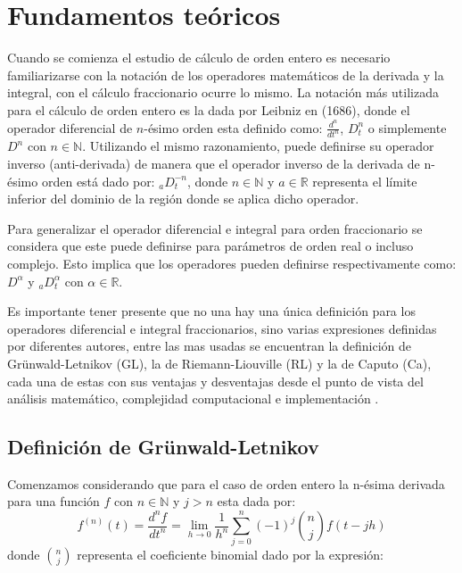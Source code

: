 \chapter{Fundamentos teóricos}		

	Cuando se comienza el estudio de cálculo de orden entero es necesario familiarizarse con la notación de los operadores matemáticos de la derivada y la integral, con el cálculo fraccionario ocurre lo mismo. La notación más utilizada para el cálculo de orden entero es la dada por Leibniz en (1686), donde el operador diferencial de $n$-ésimo orden esta definido como: $\frac{d^{n}}{dt^{n}}$, $D_{t}^{n}$ o simplemente $D^{n}$ con $n \in \mathbb{N}$. Utilizando el mismo razonamiento, puede definirse su operador inverso (anti-derivada) de manera que el operador inverso de la derivada de n-ésimo orden está dado por: $_{a}D^{-n}_{t}$, donde $n \in \mathbb{N}$ y $a \in \mathbb{R}$ representa el límite inferior del dominio de la región donde se aplica dicho operador.
			
	Para generalizar el operador diferencial e integral para orden fraccionario se considera que este puede definirse para parámetros de orden real o incluso complejo. Esto implica que los operadores pueden definirse respectivamente como: $D^{\alpha}$ y $_{a}D^{\alpha}_{t}$ con $ \alpha \in \mathbb{R}$. 
		
	Es importante tener presente que no una hay una única definición para los operadores diferencial e integral fraccionarios, sino varias expresiones definidas por diferentes autores, entre las mas usadas se encuentran la definición de Grünwald-Letnikov (GL), la de Riemann-Liouville (RL) y la de Caputo (Ca), cada una de estas con sus ventajas y desventajas desde el punto de vista del análisis matemático, complejidad computacional e implementación \cite{Petras2011}.
			
	\section{Definición de Grünwald-Letnikov}

	Comenzamos considerando que para el caso de orden entero la n-ésima derivada para una función $f$ con $n \in \mathbb{N}$ y $j>n$ esta dada por:
	\begin{equation}
		f^{(n)}(t) = \frac{d^{n}f}{dt^{n}} = \lim_{h \to 0 } \frac{1}{h^{n}} \sum_{j = 0}^{n} (-1)^{j} \binom{n}{j} f(t - jh)
		\label{ec:derivada_entera}
	\end{equation}
	donde $\binom{n}{j}$ representa el coeficiente binomial dado por la expresión:
			
